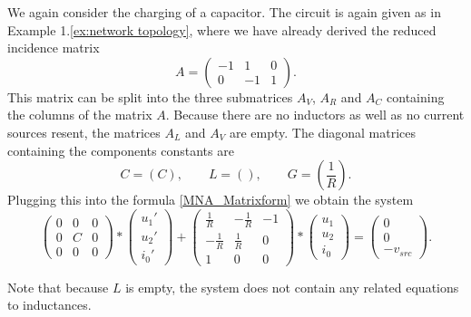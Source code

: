 \begin{example1}
	\label{ex:MNA}
	We again consider the charging of a capacitor. The circuit is again given as in Example 1.\ref{ex:network topology}, where we have already derived the reduced incidence matrix
	\begin{displaymath}
		A = 
		\left(
		\begin{matrix}
			-1 & 1 & 0 \\
			0 & -1 & 1 
		\end{matrix}
		\right).
	\end{displaymath} 
	This matrix can be split into the three submatrices $A_V$, $A_R$ and $A_C$ containing the columns of the matrix $A$. Because there are no inductors as well as no current sources resent, the matrices $A_L$ and $A_V$ are empty. The diagonal matrices containing the components constants are
	\begin{displaymath}
		C = (C), \qquad L = (), \qquad G = (\frac{1}{R}).
	\end{displaymath}
	Plugging this into the formula \eqref{MNA_Matrixform} we obtain the system
	\begin{equation}
		\label{eq:ex1 MNA}
		\begin{pmatrix}
			0 & 0 & 0 \\
			0 & C & 0 \\
			0 & 0 & 0
		\end{pmatrix}
		*
		\begin{pmatrix}
			u_1' \\
			u_2' \\
			i_0'
		\end{pmatrix}
		+
		\begin{pmatrix}
			\frac{1}{R} & -\frac{1}{R} & -1 \\
			-\frac{1}{R} & \frac{1}{R} & 0 \\
			1 & 0 & 0 
		\end{pmatrix}
		*
		\begin{pmatrix}
			u_1 \\
			u_2 \\
			i_0
		\end{pmatrix}
		=
		\begin{pmatrix}
			0 \\
			0 \\
			-v_{src}
		\end{pmatrix}.
	\end{equation}
	
	Note that because $L$ is empty, the system does not contain any related equations to inductances.
\end{example1}


